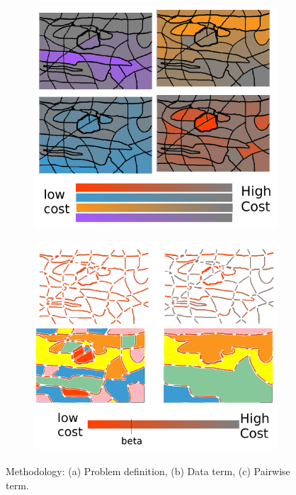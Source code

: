 \begin{figure}
\begin{subfigure}[b]{0.39\textwidth}
        \includegraphics[width=\textwidth]{data}
        \label{fig:methodTerms:data}
    \end{subfigure}
    \hfill
    \begin{subfigure}[b]{0.39\textwidth}   
        \centering 
        \includegraphics[width=\textwidth]{smooth} 
        \label{fig:methodTerms:boundary}
    \end{subfigure}
    \caption {\small Methodology: (a) Problem definition, (b) Data term, (c) Pairwise term.} 
    \label{fig:methodterms}
\end{figure}


